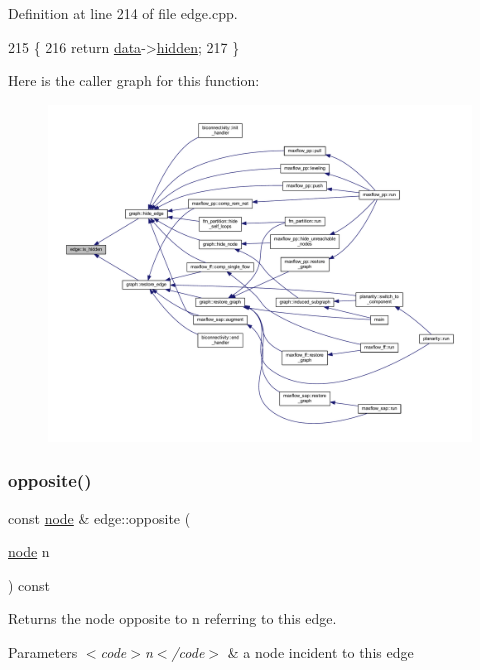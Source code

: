 Definition at line 214 of file edge.\+cpp.


\begin{DoxyCode}
215 \{
216     \textcolor{keywordflow}{return} \mbox{\hyperlink{classedge_a0ebb6dfa28b77f47529085049352b436}{data}}->\mbox{\hyperlink{classedge__data_af8dc68051e5fe3336aa31ae1f3e104c3}{hidden}};
217 \}
\end{DoxyCode}
Here is the caller graph for this function\+:\nopagebreak
\begin{figure}[H]
\begin{center}
\leavevmode
\includegraphics[width=350pt]{classedge_ab6d6192a90b1cb77ce9dee2de78d9743_icgraph}
\end{center}
\end{figure}
\mbox{\label{classedge_ab64dc3659c9003337b0c3749a8b879cf}} 
\subsubsection{\texorpdfstring{opposite()}{opposite()}}
{\footnotesize\ttfamily const \mbox{\hyperlink{classnode}{node}} \& edge\+::opposite (\begin{DoxyParamCaption}\item[{\mbox{\hyperlink{classnode}{node}}}]{n }\end{DoxyParamCaption}) const}

Returns the node opposite to {\ttfamily n} referring to this edge.


\begin{DoxyParams}{Parameters}
{\em $<$code$>$n$<$/code$>$} & a node incident to this edge \\
\hline
\end{DoxyParams}


